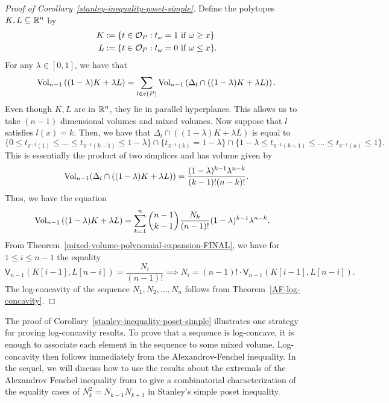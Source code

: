 \documentclass{puthesis-UG}
\begin{document}
\begin{proof}[Proof of Corollary~\ref{stanley-inequality-poset-simple}]
	Define the polytopes $K, L \subseteq \mathbb{R}^{n}$ by 
	\begin{align*}
		K & := \{t \in \mathcal{O}_P : t_\omega = 1 \text{ if } \omega \geq x\} \\
		L & := \{t \in \mathcal{O}_P : t_\omega = 0 \text{ if } \omega \leq x\}.
	\end{align*}
	For any $\lambda \in [0, 1]$, we have that 
	\[
		\operatorname{Vol}_{n-1} \left ( (1 - \lambda) K + \lambda L \right ) = \sum_{l \in e(P)}  \operatorname{Vol}_{n-1} \left ( \Delta_l \cap \left((1-\lambda) K + \lambda L\right) \right ).
	\]
	Even though $K, L$ are in $\mathbb{R}^n$, they lie in parallel hyperplanes. This allows us to take $(n-1)$ dimensional volumes and mixed volumes. Now suppose that $l$ satisfies $l(x) = k$. Then, we have that $\Delta_l \cap \left((1-\lambda) K + \lambda L \right)$ is equal to 
	\[ 
		\{0 \leq t_{\pi^{-1}(1)} \leq \ldots \leq t_{\pi^{-1}(k-1)} \leq 1-\lambda\} \cap \{t_{\pi^{-1}(k)} = 1-\lambda\} \cap \{1 - \lambda \leq t_{\pi^{-1}(k+1)} \leq \ldots \leq t_{\pi^{-1}(n)} \leq 1\}.
	\]
	This is essentially the product of two simplices and has volume given by
	\[
		\operatorname{Vol}_{n-1} (\Delta_l \cap \left((1 - \lambda) K + \lambda L\right)) = \frac{(1-\lambda)^{k-1} \lambda^{n-k}}{(k-1)! (n-k)!}.
	\]
	Thus, we have the equation 
	\begin{align*}
		\operatorname{Vol}_{n-1}\left((1-\lambda) K + \lambda L\right) & = \sum_{k = 1}^n \binom{n-1}{k-1} \frac{N_k}{(n-1)!} (1-\lambda)^{k-1} \lambda^{n-k}.
	\end{align*}
	From Theorem~\ref{mixed-volume-polynomial-expansion-FINAL}, we have for $1 \leq i \leq n-1$ the equality
	\[
		\mathsf{V}_{n-1} (K[i-1], L[n-i]) = \frac{N_i}{(n-1)!} \implies N_i = (n-1)! \cdot \mathsf{V}_{n-1} (K[i-1], L[n-i]).
	\]
	The log-concavity of the sequence $N_1, N_2, \ldots, N_n$ follows from Theorem~\ref{AF-log-concavity}. 
\end{proof}

The proof of Corollary~\ref{stanley-inequality-poset-simple} illustrates one strategy for proving log-concavity results. To prove that a sequence is log-concave, it is enough to associate each element in the sequence to some mixed volume. Log-concavity then follows immediately from the Alexandrov-Fenchel inequality. In the sequel, we will discuss how to use the results about the extremals of the Alexandrov Fenchel inequality from \cite{shenfeld2022extremals} to give a combinatorial characterization of the equality cases of $N_k^2 = N_{k-1} N_{k+1}$ in Stanley's simple poset inequality. 
\end{document}
